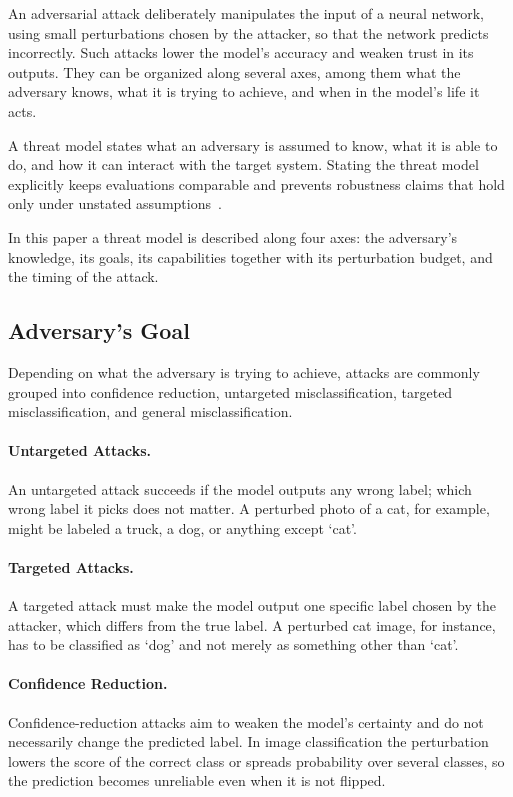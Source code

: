 \documentclass[12pt]{article}
\begin{document}
An adversarial attack deliberately manipulates the input of a neural network, using small perturbations chosen by the attacker, so that the network predicts incorrectly. Such attacks lower the model's accuracy and weaken trust in its outputs. They can be organized along several axes, among them what the adversary knows, what it is trying to achieve, and when in the model's life it acts.

A threat model states what an adversary is assumed to know, what it is able to do, and how it can interact with the target system. Stating the threat model explicitly keeps evaluations comparable and prevents robustness claims that hold only under unstated assumptions~\cite{carlini2019}.

In this paper a threat model is described along four axes: the adversary's knowledge, its goals, its capabilities together with its perturbation budget, and the timing of the attack.

\subsection{Adversary's Goal}

Depending on what the adversary is trying to achieve, attacks are commonly grouped into confidence reduction, untargeted misclassification, targeted misclassification, and general misclassification.

\paragraph{Untargeted Attacks.} An untargeted attack succeeds if the model outputs any wrong label; which wrong label it picks does not matter. A perturbed photo of a cat, for example, might be labeled a truck, a dog, or anything except `cat'.

\paragraph{Targeted Attacks.} A targeted attack must make the model output one specific label chosen by the attacker, which differs from the true label. A perturbed cat image, for instance, has to be classified as `dog' and not merely as something other than `cat'.

\paragraph{Confidence Reduction.} Confidence-reduction attacks aim to weaken the model's certainty and do not necessarily change the predicted label. In image classification the perturbation lowers the score of the correct class or spreads probability over several classes, so the prediction becomes unreliable even when it is not flipped.
\end{document}
